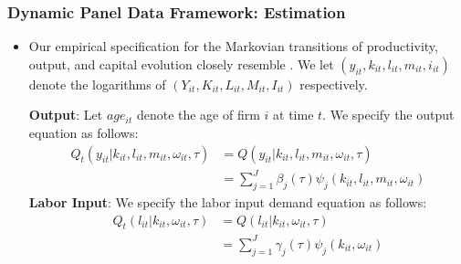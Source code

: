 \documentclass{beamer}
\begin{document}

\begin{frame}
\frametitle{Dynamic Panel Data Framework: Estimation}
\begin{itemize}
\item Our empirical specification for the Markovian transitions of productivity, output, and capital evolution closely resemble \cite{Arellano2017}.  We let $(y_{it}, k_{it}, l_{it}, m_{it}, i_{it})$ denote the logarithms of $(Y_{it}, K_{it}, L_{it}, M_{it}, I_{it})$ respectively.

\textbf{Output}:
Let $age_{it}$ denote the age of firm $i$ at time $t$. We specify the output equation as follows:
\begin{equation}\label{ymodel}
\begin{split}
Q_{t}(y_{it}|k_{it}, l_{it}, m_{it}, \omega_{it}, \tau)&=Q(y_{it}|k_{it}, l_{it}, m_{it}, \omega_{it}, \tau)\\
&=\sum_{j=1}^{J}\beta_{j}(\tau)\psi_{j}(k_{it}, l_{it}, m_{it}, \omega_{it})
\end{split}
\end{equation}
\textbf{Labor Input}:
We specify the labor input demand equation as follows:
\begin{equation} \label{lmodel}
\begin{split}
Q_{t}(l_{it}|k_{it}, \omega_{it}, \tau)&=Q(l_{it}|k_{it}, \omega_{it}, \tau)\\
&=\sum_{j=1}^{J}\gamma_{j}(\tau)\psi_{j}(k_{it}, \omega_{it})
\end{split}
\end{equation}
\end{itemize}
\end{frame}

\end{document}

